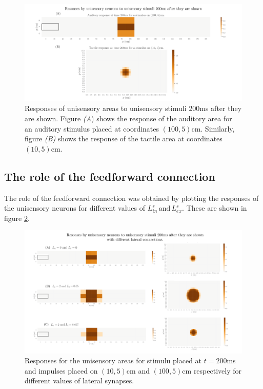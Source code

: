 \documentclass[12pt]{article}
\begin{document}
\begin{figure}[h!]
	\centering
	\hspace*{-0.6in}
	\includegraphics[width=1.2\linewidth]{fig/3-3-1.png}
	\caption{Responses of unisensory areas to unisensory stimuli 200ms after they are shown. Figure \textit{(A}) shows the response of the auditory area for an auditory stimulus placed at coordinates $(100, 5)$cm. Similarly, figure \textit{(B)} shows the response of the tactile area at coordinates $(10,5)$cm.}
	\label{fig:3.3.1}
\end{figure}

\subsection{The role of the feedforward connection}

The role of the feedforward connection was obtained by plotting the responses of the unisensory neurons for different values of $L_{in}^s \mathrm{\, and \,} L_{ex}^s$. These are shown in figure \ref{fig:3.3.3}.

\begin{figure}[h!]
	\centering
	\hspace*{-0.6in}
	\includegraphics[width=1.15\linewidth]{fig/3-3-3.png}
	\caption{Responses for the unisensory areas for stimulu placed at $t=200$ms and impulses placed on $(10,5)$cm and $(100, 5)$cm respectively for different values of lateral synapses. }
	\label{fig:3.3.3}
\end{figure}
\end{document}
